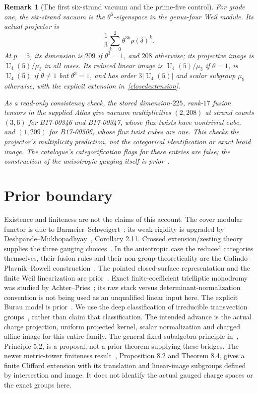 \documentclass[11pt]{amsart}
\newtheorem{remark}[theorem]{Remark}
\newcommand{\U}{\operatorname{U}}
\begin{document}
\begin{remark}[The first six-strand vacuum and the prime-five control]
For grade one, the six-strand vacuum is the
$\theta^6$-eigenspace in the genus-four Weil module. Its actual
projector is
\[
\frac13\sum_{k=0}^2\theta^{3k}\rho(\delta)^k.
\]
At $p=5$, its dimension is $209$ if $\theta^3=1$, and $208$
otherwise; its projective image is $\U_4(5)/\mu_3$ in all cases.
Its reduced linear image is $\U_4(5)/\mu_3$ if $\theta=1$,
is $\U_4(5)$ if $\theta\ne1$ but $\theta^3=1$, and has order
$3|\U_4(5)|$ and scalar subgroup $\mu_9$ otherwise, with the
explicit extension in~\eqref{closedextension}.

As a read-only consistency check, the stored dimension-$225$, rank-$17$
fusion tensors in the supplied Atlas give vacuum multiplicities
$(2,208)$ at strand counts $(3,6)$ for B17-00346 and B17-00347,
whose flux twists have nontrivial cube, and $(1,209)$ for B17-00506,
whose flux twist cubes are one. This checks the projector's multiplicity
prediction, not the categorical identification or exact braid image.
The catalogue's categorification flags for these entries are false;
the construction of the anisotropic gauging itself is prior~\cite{GPR}.
\end{remark}

\section{Prior boundary}
Existence and finiteness are not the claims of this account. The
cover modular functor is due to Barmeier--Schweigert~\cite{BS}; its
weak rigidity is upgraded by Deshpande--Mukhopadhyay~\cite{DM},
Corollary 2.11. Crossed extension/zesting theory supplies the three
gauging choices~\cite{DGP RZ}. In the anisotropic case the reduced
categories themselves, their fusion rules and their non-group-theoreticality
are the Galindo--Plavnik--Rowell construction~\cite{GPR}.
The pointed closed-surface representation and the finite Weil
linearization are prior~\cite{Stirling,GH}. Exact finite-coefficient
trielliptic monodromy was studied by Achter--Pries~\cite{AP}; its raw
stack versus determinant-normalization convention is not being used
as an unqualified linear input here. The explicit Burau model is
prior~\cite{Ven}. We use the deep classification of irreducible
transvection groups~\cite{ZS}, rather than claim that classification.
The intended advance is the actual charge projection, uniform projected
kernel, scalar normalization and charged affine image for this entire
family. The general fixed-subalgebra principle in~\cite{GKRZ},
Principle 5.2, is a proposal, not a prior theorem supplying these bridges.
The newer metric-tower finiteness result~\cite{GR26}, Proposition 8.2
and Theorem 8.4, gives a finite Clifford extension with its translation
and linear-image subgroups defined by intersection and image. It does
not identify the actual gauged charge spaces or the exact groups here.
\end{document}
